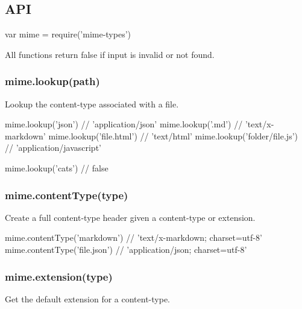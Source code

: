 \subsection*{A\+P\+I}


\begin{DoxyCode}
var mime = require(\textcolor{stringliteral}{'mime-types'})
\end{DoxyCode}


All functions return {\ttfamily false} if input is invalid or not found.

\subsubsection*{mime.\+lookup(path)}

Lookup the content-\/type associated with a file.


\begin{DoxyCode}
mime.lookup(\textcolor{stringliteral}{'json'})           \textcolor{comment}{// 'application/json'}
mime.lookup(\textcolor{stringliteral}{'.md'})            \textcolor{comment}{// 'text/x-markdown'}
mime.lookup(\textcolor{stringliteral}{'file.html'})      \textcolor{comment}{// 'text/html'}
mime.lookup(\textcolor{stringliteral}{'folder/file.js'}) \textcolor{comment}{// 'application/javascript'}

mime.lookup(\textcolor{stringliteral}{'cats'}) \textcolor{comment}{// false}
\end{DoxyCode}


\subsubsection*{mime.\+content\+Type(type)}

Create a full content-\/type header given a content-\/type or extension.


\begin{DoxyCode}
mime.contentType(\textcolor{stringliteral}{'markdown'})  \textcolor{comment}{// 'text/x-markdown; charset=utf-8'}
mime.contentType(\textcolor{stringliteral}{'file.json'}) \textcolor{comment}{// 'application/json; charset=utf-8'}
\end{DoxyCode}


\subsubsection*{mime.\+extension(type)}

Get the default extension for a content-\/type.


